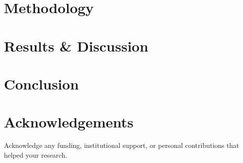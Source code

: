 \documentclass[12pt,twoside]{article}
\begin{document}
\section{Methodology}
\label{sec:method}



\section{Results \& Discussion}
\label{sec:result}




\section{Conclusion}
\label{sec:conclusion}

\section*{Acknowledgements}
Acknowledge any funding, institutional support, or personal contributions that helped your research.


\end{document}
